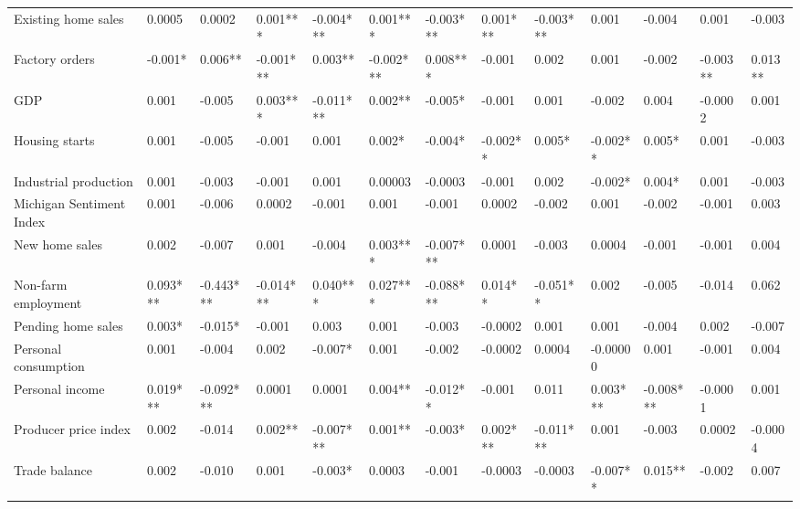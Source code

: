 \begin{landscape}
\begin{table}[]
{\begin{tabular}{lllllllllllll}
Existing home sales      & 0.0005   & 0.0002    & 0.001***  & -0.004*** & 0.001***  & -0.003*** & 0.001*** & -0.003*** & 0.001    & -0.004    & 0.001    & -0.003  \\
Factory orders           & -0.001*  & 0.006**   & -0.001*** & 0.003**   & -0.002*** & 0.008***  & -0.001   & 0.002     & 0.001    & -0.002    & -0.003** & 0.013** \\
GDP                      & 0.001    & -0.005    & 0.003***  & -0.011*** & 0.002**   & -0.005*   & -0.001   & 0.001     & -0.002   & 0.004     & -0.0002  & 0.001   \\
Housing starts           & 0.001    & -0.005    & -0.001    & 0.001     & 0.002*    & -0.004*   & -0.002** & 0.005*    & -0.002** & 0.005*    & 0.001    & -0.003  \\
Industrial production    & 0.001    & -0.003    & -0.001    & 0.001     & 0.00003   & -0.0003   & -0.001   & 0.002     & -0.002*  & 0.004*    & 0.001    & -0.003  \\
Michigan Sentiment Index & 0.001    & -0.006    & 0.0002    & -0.001    & 0.001     & -0.001    & 0.0002   & -0.002    & 0.001    & -0.002    & -0.001   & 0.003   \\
New home sales           & 0.002    & -0.007    & 0.001     & -0.004    & 0.003***  & -0.007*** & 0.0001   & -0.003    & 0.0004   & -0.001    & -0.001   & 0.004   \\
Non-farm employment      & 0.093*** & -0.443*** & -0.014*** & 0.040***  & 0.027***  & -0.088*** & 0.014**  & -0.051**  & 0.002    & -0.005    & -0.014   & 0.062   \\
Pending home sales       & 0.003*   & -0.015*   & -0.001    & 0.003     & 0.001     & -0.003    & -0.0002  & 0.001     & 0.001    & -0.004    & 0.002    & -0.007  \\
Personal consumption     & 0.001    & -0.004    & 0.002     & -0.007*   & 0.001     & -0.002    & -0.0002  & 0.0004    & -0.00000 & 0.001     & -0.001   & 0.004   \\
Personal income          & 0.019*** & -0.092*** & 0.0001    & 0.0001    & 0.004**   & -0.012**  & -0.001   & 0.011     & 0.003*** & -0.008*** & -0.0001  & 0.001   \\
Producer price index     & 0.002    & -0.014    & 0.002**   & -0.007*** & 0.001**   & -0.003*   & 0.002*** & -0.011*** & 0.001    & -0.003    & 0.0002   & -0.0004 \\
Trade balance            & 0.002    & -0.010    & 0.001     & -0.003*   & 0.0003    & -0.001    & -0.0003  & -0.0003   & -0.007** & 0.015**   & -0.002   & 0.007   \\ \hline

\end{tabular}}
\end{table}
\end{landscape}
